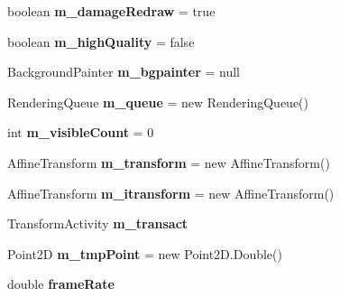 \begin{DoxyCompactItemize}
\item 
\hypertarget{classprefuse_1_1_display_a0c538582ae3557283820bc4099078d4a}{boolean {\bfseries m\-\_\-damage\-Redraw} = true}\label{classprefuse_1_1_display_a0c538582ae3557283820bc4099078d4a}

\item 
\hypertarget{classprefuse_1_1_display_a21891258fa6f493f19c965cd6872328e}{boolean {\bfseries m\-\_\-high\-Quality} = false}\label{classprefuse_1_1_display_a21891258fa6f493f19c965cd6872328e}

\item 
\hypertarget{classprefuse_1_1_display_afb2ab0d18f5439d730003e5bd57c8924}{\-Background\-Painter {\bfseries m\-\_\-bgpainter} = null}\label{classprefuse_1_1_display_afb2ab0d18f5439d730003e5bd57c8924}

\item 
\hypertarget{classprefuse_1_1_display_a5e49bad5b319d6567e7eb071708b76c9}{\-Rendering\-Queue {\bfseries m\-\_\-queue} = new \-Rendering\-Queue()}\label{classprefuse_1_1_display_a5e49bad5b319d6567e7eb071708b76c9}

\item 
\hypertarget{classprefuse_1_1_display_a0ec99bcdafd88e473ccdfe4dade2858e}{int {\bfseries m\-\_\-visible\-Count} = 0}\label{classprefuse_1_1_display_a0ec99bcdafd88e473ccdfe4dade2858e}

\item 
\hypertarget{classprefuse_1_1_display_aadd83e4c36f75532483f54379cf5d08f}{\-Affine\-Transform {\bfseries m\-\_\-transform} = new \-Affine\-Transform()}\label{classprefuse_1_1_display_aadd83e4c36f75532483f54379cf5d08f}

\item 
\hypertarget{classprefuse_1_1_display_a3af61524d82055ce0ab70b0e5a6d3151}{\-Affine\-Transform {\bfseries m\-\_\-itransform} = new \-Affine\-Transform()}\label{classprefuse_1_1_display_a3af61524d82055ce0ab70b0e5a6d3151}

\item 
\hypertarget{classprefuse_1_1_display_a282d1f81431785301e4486d2ecea0f3e}{\-Transform\-Activity {\bfseries m\-\_\-transact}}\label{classprefuse_1_1_display_a282d1f81431785301e4486d2ecea0f3e}

\item 
\hypertarget{classprefuse_1_1_display_a0ce6db2ee5a2504cc2033fb849da3a8a}{\-Point2\-D {\bfseries m\-\_\-tmp\-Point} = new \-Point2\-D.\-Double()}\label{classprefuse_1_1_display_a0ce6db2ee5a2504cc2033fb849da3a8a}

\item 
\hypertarget{classprefuse_1_1_display_aac319c1f3efef2801bcdb36886ddcf69}{double {\bfseries frame\-Rate}}\label{classprefuse_1_1_display_aac319c1f3efef2801bcdb36886ddcf69}


\end{DoxyCompactItemize}
